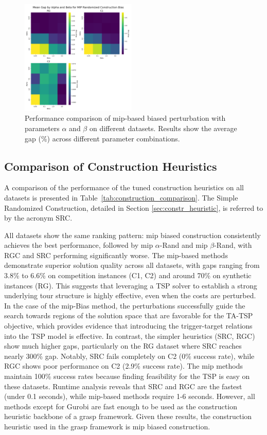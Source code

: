 \documentclass[twocolumn]{article} %
\begin{document}
\begin{figure}[h]
    \centering
    \includegraphics[width=0.49\textwidth]{figures/alpha_beta_grid_mip_randomized_construction_bias.png}
    \caption{Performance comparison of \gls{mip}-based biased perturbation with parameters $\alpha$ and $\beta$ on different datasets. Results show the average gap (\%) across different parameter combinations.}
    \label{fig:alpha_beta_grid_mip_randomized_construction_bias} 
\end{figure} 

\subsection{Comparison of Construction Heuristics}

A comparison of the performance of the tuned construction heuristics on all datasets is presented in Table~\ref{tab:construction_comparison}.
The Simple Randomized Construction, detailed in Section \ref{sec:constr_heuristic}, is referred to by the acronym SRC.

All datasets show the same ranking pattern: \gls{mip} biased construction consistently achieves the best performance, followed by \gls{mip} $\alpha$-Rand and \gls{mip} $\beta$-Rand, with RGC and SRC performing significantly worse.
The \gls{mip}-based methods demonstrate superior solution quality across all datasets, with gaps ranging from 3.8\% to 6.6\% on competition instances (C1, C2) and around 70\% on synthetic instances (RG).
This suggests that leveraging a TSP solver to establish a strong underlying tour structure is highly effective, even when the costs are perturbed.
In the case of the \gls{mip}-Bias method, the perturbations successfully guide the search towards regions of the solution space that are favorable for the TA-TSP objective, which provides evidence that introducing the trigger-target relations into the TSP model is effective.
In contrast, the simpler heuristics (SRC, RGC) show much higher gaps, particularly on the RG dataset where SRC reaches nearly 300\% gap. Notably, SRC fails completely on C2 (0\% success rate), while RGC shows poor performance on C2 (2.9\% success rate).
The \gls{mip} methods maintain 100\% success rates because finding feasibility for the TSP is easy on these datasets.
Runtime analysis reveals that SRC and RGC are the fastest (under 0.1 seconds), while \gls{mip}-based methods require 1-6 seconds.
However, all methods except for Gurobi are fast enough to be used as the construction heuristic backbone of a \gls{grasp} framework.
Given these results, the construction heuristic used in the \gls{grasp} framework is \gls{mip} biased construction.
\end{document}
